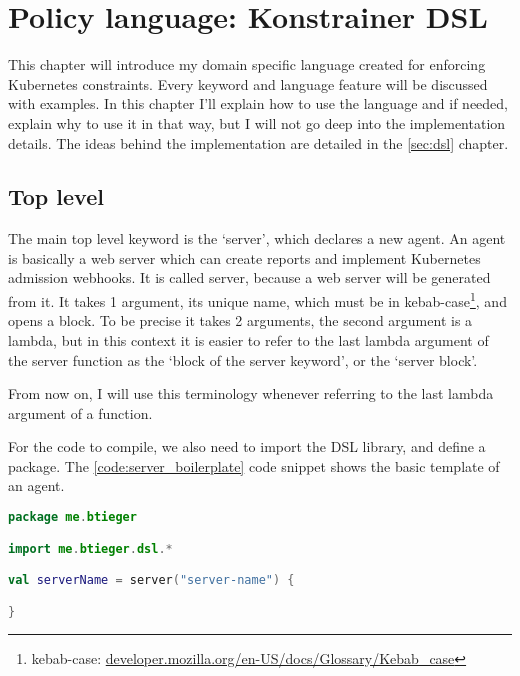 \setlength{\parindent}{0pt}
\setlength{\parskip}{0.6em}

\chapter[Policy language]{Policy language: Konstrainer DSL}
\label{chap:konst_dsl}

This chapter will introduce my domain specific language created for enforcing Kubernetes constraints. Every keyword and language feature will be discussed with examples. In this chapter I'll explain how to use the language and if needed, explain why to use it in that way, but I will not go deep into the implementation details. The ideas behind the implementation are detailed in the \ref{sec:dsl}  chapter.

\section{Top level}

The main top level keyword is the `server', which declares a new agent. An agent is basically a web server which can create reports and implement Kubernetes admission webhooks. It is called server, because a web server will be generated from it. It takes 1 argument, its unique name, which must be in kebab-case\footnote{kebab-case: \url{developer.mozilla.org/en-US/docs/Glossary/Kebab_case}}, and opens a block. To be precise it takes 2 arguments, the second argument is a lambda, but in this context it is easier to refer to the last lambda argument of the server function as the `block of the server keyword', or the `server block'.

From now on, I will use this terminology whenever referring to the last lambda argument of a function.

For the code to compile, we also need to import the DSL library, and define a package. The \ref{code:server_boilerplate} code snippet shows the basic template of an agent.

\begin{lstlisting}[caption={Template of a DSL file},language=Kotlin,label=code:server_boilerplate]
package me.btieger

import me.btieger.dsl.*

val serverName = server("server-name") {

}
\end{lstlisting}

